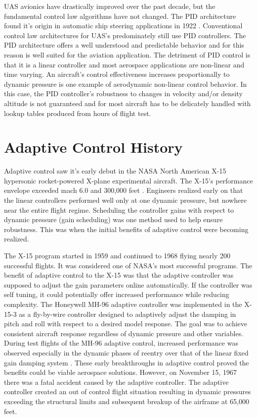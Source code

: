\ac{UAS} avionics have drastically improved over the past decade, but the fundamental control law algorithms have not changed.  The \ac{PID} architecture found it's origin in automatic ship steering applications in 1922 \cite{minorsky1922pid}.  Conventional control law architectures for \ac{UAS}'s predominately still use \ac{PID} controllers.  The \ac{PID} architecture offers a well understood and predictable behavior and for this reason is well suited for the aviation application.  The detriment of \ac{PID} control is that it is a linear controller and most aerospace applications are non-linear and time varying.   An aircraft's control effectiveness increases proportionally to dynamic pressure is one example of aerodynamic non-linear control behavior.  In this case, the \ac{PID} controller's robustness to changes in velocity and/or density altitude is not guaranteed and for most aircraft has to be delicately handled with lookup tables produced from hours of flight test.   

\section{Adaptive Control History}\label{history}
Adaptive control saw it's early debut in the NASA North American X-15 hypersonic rocket-powered X-plane experimental aircraft.  The X-15's performance envelope exceeded mach 6.0 and 300,000 feet \cite{jenkins2000x15specs}.  Engineers realized early on that the linear controllers performed well only at one dynamic pressure, but nowhere near the entire flight regime.  Scheduling the controller gains with respect to dynamic pressure (gain scheduling) was one method used to help ensure robustness.  This was when the initial benefits of adaptive control were becoming realized.

The X-15 program started in 1959 and continued to 1968 flying nearly 200 successful flights.  It was considered one of NASA's most successful programs.  The benefit of adaptive control to the X-15 was that the adaptive controller was supposed to adjust the gain parameters online automatically.  If the controller was self tuning, it could potentially offer increased performance while reducing complexity.  The Honeywell MH-96 adaptive controller was implemented in the X-15-3 as a fly-by-wire controller designed to adaptively adjust the damping in pitch and roll with respect to a desired model response.  The goal was to achieve consistent aircraft response regardless of dynamic pressure and other variables.  During test flights of the MH-96 adaptive control, increased performance was observed especially in the dynamic phases of reentry over that of the linear fixed gain damping system \cite{dydek2010adaptive}.  These early breakthroughs in adaptive control proved the benefits could be viable aerospace solutions.  However, on November 15, 1967 there was a fatal accident caused by the adaptive controller.  The adaptive controller created an out of control flight situation resulting in dynamic pressures exceeding the structural limits and subsequent breakup of the airframe at 65,000 feet.

